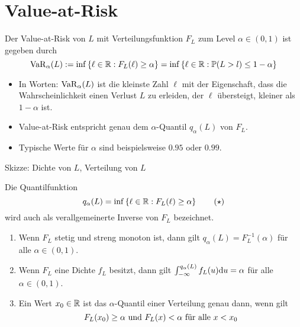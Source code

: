 \section{Value-at-Risk}

\begin{*definition}
	Der Value-at-Risk von $L$ mit Verteilungsfunktion $F_L$ zum Level $\alpha \in (0,1)$ ist gegeben durch
	\begin{equation*}
		\operatorname{VaR}_\alpha(L) \mathrel{:=} \inf \left\{ \ell \in \mathbb{R}: F_L(\ell) \ge \alpha \right\} = \inf \left\{ \ell \in \mathbb{R}: \mathbb{P}(L > l) \le 1 - \alpha \right\}
	\end{equation*}
\end{*definition}

\begin{itemize}[nolistsep]
	\item In Worten: $\operatorname{VaR}_\alpha(L)$ ist die kleinste Zahl $\ell$ mit der Eigenschaft, dass die Wahrscheinlichkeit einen Verlust $L$ zu erleiden, der $\ell$ übersteigt, kleiner als $1-\alpha$ ist.
	\item Value-at-Risk entspricht genau dem $\alpha$-Quantil $q_\alpha(L)$ von $F_L$.
	\item Typische Werte für $\alpha$ sind beispielsweise $0.95$ oder $0.99$.
\end{itemize}

Skizze: Dichte von $L$, Verteilung von $L$

Die Quantilfunktion
\begin{equation*}
	q_\alpha(L) = \inf \left\{ \ell \in \mathbb{R}: F_L(\ell) \ge \alpha \right\}
	\tag{$\star$} \label{eq: quantil-star}
\end{equation*}
wird auch als verallgemeinerte Inverse von $F_L$ bezeichnet.

\begin{lemma}
	\begin{enumerate}[label=(\alph*)]
		\item Wenn $F_L$ stetig und streng monoton ist, dann gilt $q_\alpha(L) = F_L^{-1}(\alpha)$ für alle $\alpha \in (0,1)$.
		\item Wenn $F_L$ eine Dichte $f_L$ besitzt, dann gilt $\int_{-\infty}^{q_\alpha(L)} f_L(u) \mathrm{d}{u} = \alpha$ für alle $\alpha \in (0,1)$.
		\item Ein Wert $x_0 \in \mathbb{R}$ ist das $\alpha$-Quantil einer Verteilung genau dann, wenn gilt
		\begin{equation*}
			F_L(x_0) \ge \alpha \text{ und } F_L(x) < \alpha \text{ für alle } x < x_0
		\end{equation*} 
	\end{enumerate}
\end{lemma}

